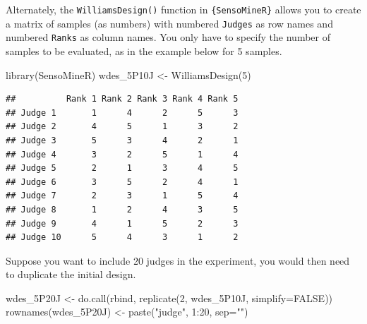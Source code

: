 \documentclass[
]{krantz}
\makeatletter
\newenvironment{Shaded}{\begin{snugshade}}{\end{snugshade}}
\newcommand{\AttributeTok}[1]{\textcolor[rgb]{0.61,0.61,0.61}{#1}}
\newcommand{\ConstantTok}[1]{\textcolor[rgb]{0,0,0}{#1}}
\newcommand{\DecValTok}[1]{\textcolor[rgb]{0.06,0.06,0.06}{#1}}
\newcommand{\FunctionTok}[1]{\textcolor[rgb]{0,0,0}{#1}}
\newcommand{\NormalTok}[1]{#1}
\newcommand{\OtherTok}[1]{\textcolor[rgb]{0.37,0.37,0.37}{#1}}
\newcommand{\SpecialCharTok}[1]{\textcolor[rgb]{0,0,0}{#1}}
\newcommand{\StringTok}[1]{\textcolor[rgb]{0.5,0.5,0.5}{#1}}
\newenvironment{kframe}{%
\medskip{}
\setlength{\fboxsep}{.8em}
 \def\at@end@of@kframe{}%
 \ifinner\ifhmode%
  \def\at@end@of@kframe{\end{minipage}}%
  \begin{minipage}{\columnwidth}%
 \fi\fi%
 \def\FrameCommand##1{\hskip\@totalleftmargin \hskip-\fboxsep
 \colorbox{shadecolor}{##1}\hskip-\fboxsep
     \hskip-\linewidth \hskip-\@totalleftmargin \hskip\columnwidth}%
 \MakeFramed {\advance\hsize-\width
   \@totalleftmargin\z@ \linewidth\hsize
   \@setminipage}}%
 {\par\unskip\endMakeFramed%
 \at@end@of@kframe}
\renewenvironment{Shaded}{\begin{kframe}}{\end{kframe}}
\makeatother
\begin{document}
Alternately, the \texttt{WilliamsDesign()} function in \texttt{\{SensoMineR\}} allows you to create a matrix of samples (as numbers) with numbered \texttt{Judges} as row names and numbered \texttt{Ranks} as column names. You only have to specify the number of samples to be evaluated, as in the example below for 5 samples.

\begin{Shaded}
\begin{Highlighting}[]
\FunctionTok{library}\NormalTok{(SensoMineR)}
\NormalTok{wdes\_5P10J }\OtherTok{\textless{}{-}} \FunctionTok{WilliamsDesign}\NormalTok{(}\DecValTok{5}\NormalTok{)}
\end{Highlighting}
\end{Shaded}

\begin{verbatim}
##          Rank 1 Rank 2 Rank 3 Rank 4 Rank 5
## Judge 1       1      4      2      5      3
## Judge 2       4      5      1      3      2
## Judge 3       5      3      4      2      1
## Judge 4       3      2      5      1      4
## Judge 5       2      1      3      4      5
## Judge 6       3      5      2      4      1
## Judge 7       2      3      1      5      4
## Judge 8       1      2      4      3      5
## Judge 9       4      1      5      2      3
## Judge 10      5      4      3      1      2
\end{verbatim}

Suppose you want to include 20 judges in the experiment, you would then need to duplicate the initial design.

\begin{Shaded}
\begin{Highlighting}[]
\NormalTok{wdes\_5P20J }\OtherTok{\textless{}{-}} \FunctionTok{do.call}\NormalTok{(rbind, }\FunctionTok{replicate}\NormalTok{(}\DecValTok{2}\NormalTok{, wdes\_5P10J, }\AttributeTok{simplify=}\ConstantTok{FALSE}\NormalTok{))}
\FunctionTok{rownames}\NormalTok{(wdes\_5P20J) }\OtherTok{\textless{}{-}} \FunctionTok{paste}\NormalTok{(}\StringTok{"judge"}\NormalTok{, }\DecValTok{1}\SpecialCharTok{:}\DecValTok{20}\NormalTok{, }\AttributeTok{sep=}\StringTok{""}\NormalTok{)}
\end{Highlighting}
\end{Shaded}
\end{document}
